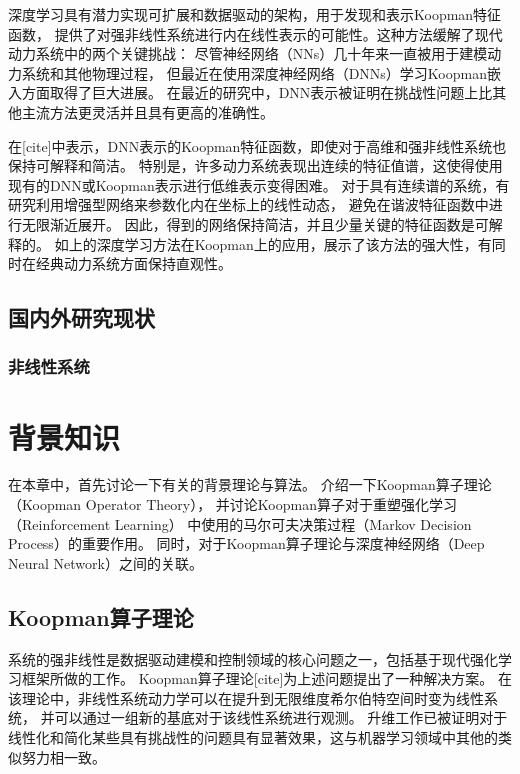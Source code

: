 \documentclass[AutoFakeBold]{LZUThesis}
\begin{document}
深度学习具有潜力实现可扩展和数据驱动的架构，用于发现和表示Koopman特征函数，
提供了对强非线性系统进行内在线性表示的可能性。这种方法缓解了现代动力系统中的两个关键挑战：
尽管神经网络（NNs）几十年来一直被用于建模动力系统和其他物理过程，
但最近在使用深度神经网络（DNNs）学习Koopman嵌入方面取得了巨大进展。
在最近的研究中，DNN表示被证明在挑战性问题上比其他主流方法更灵活并且具有更高的准确性。

在[cite]中表示，DNN表示的Koopman特征函数，即使对于高维和强非线性系统也保持可解释和简洁。
特别是，许多动力系统表现出连续的特征值谱，这使得使用现有的DNN或Koopman表示进行低维表示变得困难。
对于具有连续谱的系统，有研究利用增强型网络来参数化内在坐标上的线性动态，
避免在谐波特征函数中进行无限渐近展开。
因此，得到的网络保持简洁，并且少量关键的特征函数是可解释的。
如上的深度学习方法在Koopman上的应用，展示了该方法的强大性，有同时在经典动力系统方面保持直观性。


\section{国内外研究现状}

\subsection{非线性系统}


\chapter{背景知识}
在本章中，首先讨论一下有关的背景理论与算法。
介绍一下Koopman算子理论（Koopman Operator Theory），
并讨论Koopman算子对于重塑强化学习（Reinforcement Learning）
中使用的马尔可夫决策过程（Markov Decision Process）的重要作用。
同时，对于Koopman算子理论与深度神经网络（Deep Neural Network）之间的关联。

\section{Koopman算子理论}
系统的强非线性是数据驱动建模和控制领域的核心问题之一，包括基于现代强化学习框架所做的工作。
Koopman算子理论[cite]为上述问题提出了一种解决方案。
在该理论中，非线性系统动力学可以在提升到无限维度希尔伯特空间时变为线性系统，
并可以通过一组新的基底对于该线性系统进行观测。
升维工作已被证明对于线性化和简化某些具有挑战性的问题具有显著效果，这与机器学习领域中其他的类似努力相一致。
\end{document}
